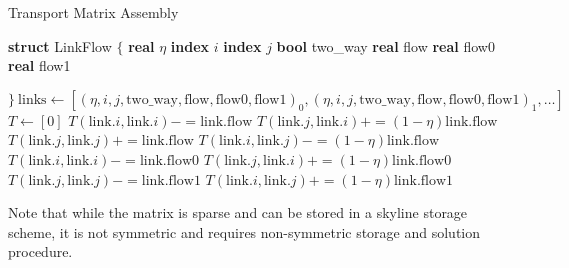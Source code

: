 \documentclass[10pt]{report}
\newcommand{\pluseq}{\ensuremath{\mathrel{+}=}}
\newcommand{\minuseq}{\ensuremath{\mathrel{-}=}}
\newcommand{\IndentedState}[1]{\State\hspace{\algorithmicindent} #1}
\begin{document}
\begin{algorithm}
  \caption{Transport Matrix Assembly}\label{TransportAssembly}
  \begin{algorithmic}[1]
    \State \textbf{struct} LinkFlow $\{$
        \IndentedState \textbf{real} $\eta$
        \IndentedState \textbf{index} $i$
        \IndentedState \textbf{index} $j$
        \IndentedState \textbf{bool} two\_way
        \IndentedState \textbf{real} flow
        \IndentedState \textbf{real} flow0
        \IndentedState \textbf{real} flow1
        
    \State  $\}\ \text{links} \gets [(\eta, i, j, \text{two\_way}, \text{flow}, \text{flow0}, \text{flow1})_0, (\eta, i, j, \text{two\_way}, \text{flow}, \text{flow0}, \text{flow1})_1, \ldots]$
    \State $T \gets [0]$
            \State $T(\text{link}.i, \text{link}.i) \minuseq \text{link.flow}$
            \State $T(\text{link}.j, \text{link}.i) \pluseq \left(1-\eta\right) \text{link.flow}$
        \Else %
            \State $T(\text{link}.j, \text{link}.j) \pluseq \text{link.flow}$
            \State $T(\text{link}.i, \text{link}.j) \minuseq \left(1-\eta\right) \text{link.flow}$
        \EndIf
      \Else
            \State $T(\text{link}.i, \text{link}.i) \minuseq \text{link.flow0}$
            \State $T(\text{link}.j, \text{link}.i) \pluseq \left(1-\eta\right) \text{link.flow0}$
        \EndIf
            \State $T(\text{link}.j, \text{link}.j) \minuseq \text{link.flow1}$
            \State $T(\text{link}.i, \text{link}.j) \pluseq \left(1-\eta\right) \text{link.flow1}$
        \EndIf
      \EndIf
    \EndFor
  \end{algorithmic}
\end{algorithm}

Note that while the matrix is sparse and can be stored in a skyline storage scheme, it is not symmetric and
requires non-symmetric storage and solution procedure.
 
\end{document}
